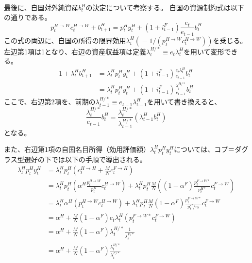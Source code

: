 最後に、自国対外純資産\(b_t^H\)の決定について考察する。
自国の資源制約式は以下の通りである。
\begin{equation}
    p_t^{H\to W}c_t^{H\to W}+b_{t+1}^H=p_t^Hy_t^H+(1+i_{t-1}^F)\frac{e_t}{e_{t-1}}b_t^H
    \label{eq:appendix_insulation_effect_other_nfa_budget_raw}
\end{equation}
この式の両辺に、自国の所得の限界効用\(\lambda_t^H(=1/(p_t^{H\to W}c_t^{H\to W}))\)を乗じる。左辺第1項は1となり、右辺の資産収益項は定義\(\lambda_t^{H/*}\equiv e_t\lambda_t^H\)を用いて変形できる。
\begin{align}
1+\lambda_t^Hb_{t+1}^H&=\lambda_t^Hp_t^Hy_t^H+(1+i_{t-1}^F)\frac{e_t\lambda_t^H}{e_{t-1}}b_t^H \label{eq:appendix_insulation_effect_other_nfa_transform_step1} \\
&=\lambda_t^Hp_t^Hy_t^H+(1+i_{t-1}^F)\frac{\lambda_t^{H/*}}{e_{t-1}}b_t^H
\label{eq:appendix_insulation_effect_other_nfa_transform_step2}
\end{align}
ここで、右辺第2項を、前期の\(\lambda_{t-1}^{H/*}\equiv e_{t-1}\lambda_{t-1}^H\)を用いて書き換えると、
\begin{equation}
\frac{\lambda_t^{H/*}}{e_{t-1}}b_t^H=\frac{\lambda_t^{H/*}}{\lambda_{t-1}^{H/*}}(\lambda_{t-1}^Hb_t^H)
\label{eq:appendix_insulation_effect_other_nfa_shift}
\end{equation}
となる。

また、右辺第1項の自国名目所得（効用評価額）\(\lambda_t^Hp_t^Hy_t^H\)については、コブ＝ダグラス型選好の下では以下の手順で導出される。
\begin{align}
\lambda_t^Hp_t^Hy_t^H&=\lambda_t^Hp_t^H(c_t^{H\to H}+\frac{M}{N}c_t^{F\to H}) \label{eq:appendix_insulation_effect_other_nfa_income_step1} \\
&=\lambda_t^Hp_t^H\left(\alpha^H\frac{p_t^{H\to W}}{p_t^H}c_t^{H\to W}\right)+\lambda_t^Hp_t^H\frac{M}{N}\left((1-\alpha^F)\frac{p_t^{F\to W*}}{p_t^{H*}}c_t^{F\to W}\right) \label{eq:appendix_insulation_effect_other_nfa_income_step2} \\
&=\lambda_t^H\alpha^H(p_t^{H\to W}c_t^{H\to W})+\lambda_t^Hp_t^H\frac{M}{N}(1-\alpha^F)\frac{p_t^{F\to W*}}{p_t^H/e_t}c_t^{F\to W} \label{eq:appendix_insulation_effect_other_nfa_income_step3} \\
&=\alpha^H+\frac{M}{N}(1-\alpha^F)e_t\lambda_t^H(p_t^{F\to W*}c_t^{F\to W}) \label{eq:appendix_insulation_effect_other_nfa_income_step4} \\
&=\alpha^H+\frac{M}{N}(1-\alpha^F)\lambda_t^{H/*}\frac{1}{\lambda_t^{F/*}} \label{eq:appendix_insulation_effect_other_nfa_income_step5} \\
&=\alpha^H+\frac{M}{N}(1-\alpha^F)\frac{\lambda_t^{H/*}}{\lambda_t^{F/*}}
\label{eq:appendix_insulation_effect_other_nfa_income_final}
\end{align}

